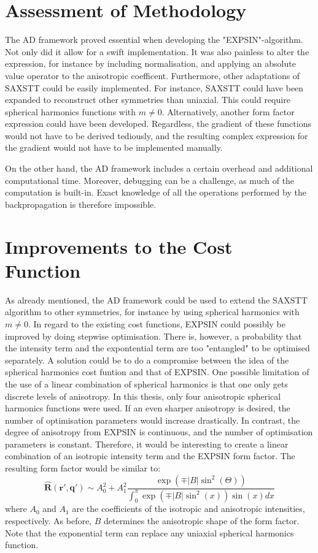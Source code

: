 \section{Assessment of Methodology}
\noindent
The AD framework proved essential when developing the "EXPSIN"-algorithm. Not only did it allow for a swift implementation.
It was also painless to alter the expression, for instance by including normalisation, and applying an absolute value operator to the anisotropic coefficent.
Furthermore, other adaptations of SAXSTT could be easily implemented. For instance, SAXSTT could have been expanded to reconstruct other symmetries than uniaxial.
This could require spherical harmonics functions with $m \neq 0$. Alternatively, another form factor expression could have been developed.
Regardless, the gradient of these functions would not have to be derived tediously, and the resulting complex expression for the gradient would not have to be implemented manually.

On the other hand, the AD framework includes a certain overhead and additional computational time. Moreover, debugging can be a challenge, as much of the computation is built-in.
Exact knowledge of all the operations performed by the backpropagation is therefore impossible.


\section{Improvements to the Cost Function}
As already mentioned, the AD framework could be used to extend the SAXSTT algorithm to other symmetries, for instance by using spherical harmonics with $m \neq 0$.
In regard to the existing cost functions, EXPSIN could possibly be improved by doing stepwise optimisation.
There is, however, a probability that the intensity term and the expontential term are too "entangled" to be optimised separately.
A solution could be to do a compromise between the idea of the spherical harmonics cost funtion and that of EXPSIN.
One possible limitation of the use of a linear combination of spherical harmonics is that one only gets discrete levels of anisotropy.
In this thesis, only four anisotropic spherical harmonics functions were used. If an even sharper anisotropy is desired, the number of optimisation parameters would increase drastically.
In contrast, the degree of anisotropy from EXPSIN is continuous, and the number of optimisation parameters is constant.
Therefore, it would be interesting to create a linear combination of an isotropic intensity term and the EXPSIN form factor.
The resulting form factor would be similar to:
\begin{equation}
    \label{eq:form_factor_linear_combination}
    \bm{\widehat{R}}(\bm{r'}, \bm{q'}) \sim A_{0}^{2} + A_{1}^{2} \frac{\exp\left(\mp |B| \sin^2(\Theta) \right)} {\int_{0}^{\pi} \exp\left( \mp |B| \sin^{2}(x) \right) \sin(x) dx}
\end{equation}
\noindent
where $A_{0}$ and $A_{1}$ are the coefficients of the isotropic and anisotropic intensities, respectively. As before, $B$ determines the anisotropic shape of the form factor.
Note that the exponential term can replace any uniaxial spherical harmonics function.